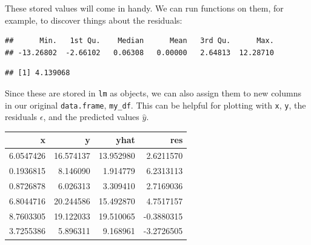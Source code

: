 \documentclass[]{book}
\newenvironment{Shaded}{\begin{snugshade}}{\end{snugshade}}
\newcommand{\KeywordTok}[1]{\textcolor[rgb]{0.13,0.29,0.53}{\textbf{#1}}}
\newcommand{\CommentTok}[1]{\textcolor[rgb]{0.56,0.35,0.01}{\textit{#1}}}
\newcommand{\OperatorTok}[1]{\textcolor[rgb]{0.81,0.36,0.00}{\textbf{#1}}}
\newcommand{\NormalTok}[1]{#1}
\theoremstyle{definition}
\theoremstyle{definition}
\theoremstyle{definition}
\theoremstyle{remark}
\begin{document}
These stored values will come in handy. We can run functions on them,
for example, to discover things about the residuals:

\begin{Shaded}
\end{Shaded}

\begin{verbatim}
##      Min.   1st Qu.    Median      Mean   3rd Qu.      Max. 
## -13.26802  -2.66102   0.06308   0.00000   2.64813  12.28710
\end{verbatim}

\begin{Shaded}
\end{Shaded}

\begin{verbatim}
## [1] 4.139068
\end{verbatim}

Since these are stored in \texttt{lm} as objects, we can also assign
them to new columns in our original \texttt{data.frame},
\texttt{my\_df}. This can be helpful for plotting with \texttt{x},
\texttt{y}, the residuals \(\epsilon\), and the predicted values
\(\hat{y}\).

\begin{Shaded}
\end{Shaded}

\begin{tabular}{r|r|r|r}
\hline
x & y & yhat & res\\
\hline
6.0547426 & 16.574137 & 13.952980 & 2.6211570\\
\hline
0.1936815 & 8.146090 & 1.914779 & 6.2313113\\
\hline
0.8726878 & 6.026313 & 3.309410 & 2.7169036\\
\hline
6.8044716 & 20.244586 & 15.492870 & 4.7517157\\
\hline
8.7603305 & 19.122033 & 19.510065 & -0.3880315\\
\hline
3.7255386 & 5.896311 & 9.168961 & -3.2726505\\
\hline
\end{tabular}
\end{document}
